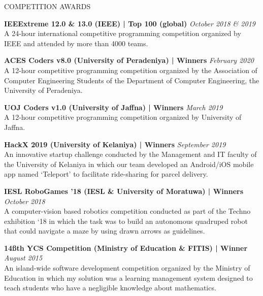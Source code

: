 \documentclass{cv}
\begin{document}
\begin{rSection}{COMPETITION AWARDS}{
        {\bf IEEExtreme 12.0 \& 13.0 (IEEE) | Top 100 (global)}                         \hfill {\em October 2018 \& 2019}
        \\A 24-hour international competitive programming competition organized by IEEE and attended by more than 4000 teams. \par

        {\bf ACES Coders v8.0 (University of Peradeniya) | Winners}                     \hfill {\em February 2020}
        \\A 12-hour competitive programming competition organized by the Association of Computer Engineering Students of the Department of Computer Engineering, the University of Peradeniya.\par

        {\bf UOJ Coders v1.0 (University of Jaffna) | Winners}                          \hfill {\em March 2019}
        \\A 12-hour competitive programming competition organized by University of Jaffna.\par

        {\bf HackX 2019 (University of Kelaniya) | Winners}                             \hfill {\em September 2019}
        \\An innovative startup challenge conducted by the Management and IT faculty of the University of Kelaniya in which our team developed an Android/iOS mobile app named `Teleport' to facilitate ride-sharing for parcel delivery.\par

        {\bf IESL RoboGames '18 (IESL \& University of Moratuwa) | Winners}             \hfill {\em October 2018}
        \\A computer-vision based robotics competition conducted as part of the Techno exhibition `18 in which the task was to build an autonomous quadruped robot that could navigate a maze by using drawn arrows as guidelines.\par

        {\bf 14\ss{th} YCS Competition (Ministry of Education \& FITIS) | Winner}       \hfill {\em August 2015}
        \\An island-wide software development competition organized by the Ministry of Education in which my solution was a learning management system designed to teach students who have a negligible knowledge about mathematics.\par

}
\end{rSection}
\end{document}

